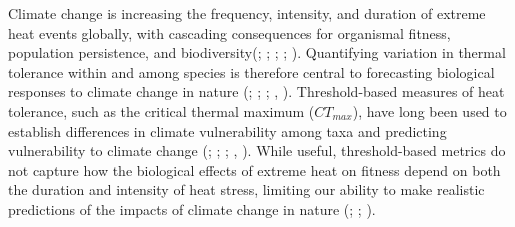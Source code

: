 \documentclass[
  11pt,
]{article}
\begin{document}
Climate change is increasing the frequency, intensity, and duration of
extreme heat events globally, with cascading consequences for organismal
fitness, population persistence, and
biodiversity(; ; ;
;
). Quantifying
variation in thermal tolerance within and among species is therefore
central to forecasting biological responses to climate change in nature
(;
;
;
,
). Threshold-based
measures of heat tolerance, such as the critical thermal maximum
(\(CT_{max}\)), have long been used to establish differences in climate
vulnerability among taxa and predicting vulnerability to climate change
(;
;
;
,
). While useful,
threshold-based metrics do not capture how the biological effects of
extreme heat on fitness depend on both the duration and intensity of
heat stress, limiting our ability to make realistic predictions of the
impacts of climate change in nature
(;
;
).
\end{document}
